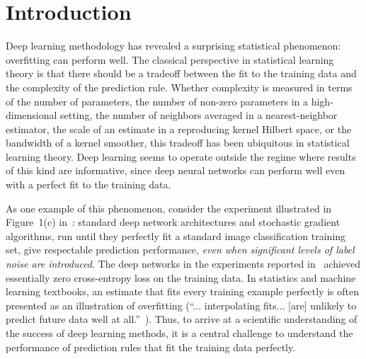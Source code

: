\documentclass[11pt,notitlepage]{article}
\begin{document}
\section{Introduction}
Deep
learning methodology has revealed a surprising statistical
phenomenon: overfitting can perform well.
The classical perspective in statistical learning theory is that
there should be a tradeoff between the fit to the training data
and the complexity of the prediction rule. Whether complexity
is measured in terms of the number of parameters, the number of
non-zero parameters in a high-dimensional setting, the number of
neighbors averaged in a nearest-neighbor estimator, the scale of an
estimate in a reproducing kernel Hilbert space, or the bandwidth of
a kernel smoother, this tradeoff has been ubiquitous
in statistical learning theory.  Deep learning
seems to operate outside the regime where results of this kind are
informative, since deep neural networks can perform well even with
a perfect fit to the training data.

As one example of this phenomenon, consider the experiment
illustrated in Figure~1(c) in~\cite{zbhrv-udlrrg-17}: standard deep
network architectures and stochastic gradient algorithms, run until
they perfectly fit a standard image classification training set,
give respectable prediction performance, {\em even when significant
levels of label noise are introduced}.  The deep networks in the
experiments reported in~\cite{zbhrv-udlrrg-17} achieved essentially
zero cross-entropy loss on the training data.  In statistics
and machine learning textbooks, an estimate that fits every
training example perfectly is often presented as an illustration
of overfitting (``... interpolating fits... [are] unlikely to
predict future data well at all.''~\cite[p37]{htf-esl-01}). Thus,
to arrive at a scientific understanding of the success of deep
learning methods, it is a central challenge to understand the
performance of prediction rules that fit the training data perfectly.
\end{document}
